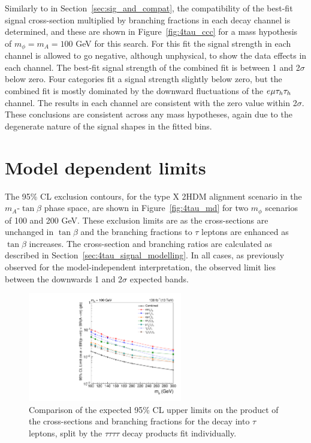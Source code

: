 Similarly to in Section~\ref{sec:sig_and_compat}, the compatibility of the best-fit signal cross-section multiplied by branching fractions in each decay channel is determined, and these are shown in Figure~\ref{fig:4tau_ccc} for a mass hypothesis of $m_{\phi}=m_{A}=100$ GeV for this search.
For this fit the signal strength in each channel is allowed to go negative, although unphysical, to show the data effects in each channel.
The best-fit signal strength of the combined fit is between 1 and 2$\sigma$ below zero.
Four categories fit a signal strength slightly below zero, but the combined fit is mostly dominated by the downward fluctuations of the $e\mu\tau_{h}\tau_{h}$ channel.
The results in each channel are consistent with the zero value within 2$\sigma$.
These conclusions are consistent across any mass hypotheses, again due to the degenerate nature of the signal shapes in the fitted bins.

\section{Model dependent limits}

The 95\% \ac{CL} exclusion contours, for the type X \ac{2HDM} alignment scenario in the $m_A$-$\tan\beta$ phase space, are shown in Figure~\ref{fig:4tau_md} for two $m_{\phi}$ scenarios of 100 and 200 GeV.
These exclusion limits are  as the cross-sections are unchanged in $\tan\beta$ and the branching fractions to $\tau$ leptons are enhanced as $\tan\beta$ increases.
The cross-section and branching ratios are calculated as described in Section~\ref{sec:4tau_signal_modelling}.
In all cases, as previously observed for the model-independent interpretation, the observed limit lies between the downwards 1 and 2$\sigma$ expected bands. \\


\begin{figure}[!hbtp]
\centering
    \includegraphics[width=0.6\textwidth]{Figures/limit_comparison_4tau.pdf}
\caption[Plot of the expected model-independent limits split by the $\tau\tau\tau\tau$ decay channels.]{Comparison of the expected 95\% CL upper limits on the product of the cross-sections and branching fractions for the decay into $\tau$ leptons, split by the $\tau\tau\tau\tau$ decay products fit individually.}
\label{fig:4tau_limit_comparison}
\end{figure}

